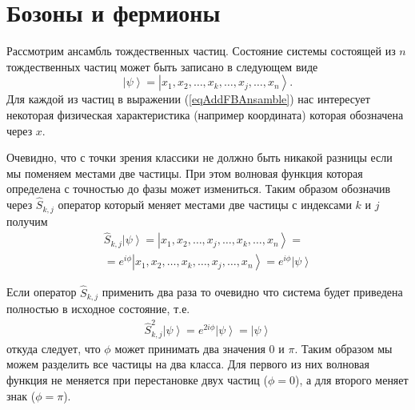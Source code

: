 \section{Бозоны и фермионы}
\label{AddFermionBoson}

Рассмотрим ансамбль тождественных частиц. Состояние системы состоящей
из $n$ тождественных частиц может быть записано в следующем виде
\begin{equation}
  \left|\psi\right> = \left|x_1, x_2, \dots, x_k, \dots, x_j, \dots,
  x_n\right>.
  \label{eqAddFBAnsamble}
\end{equation}
Для каждой из частиц в выражении (\ref{eqAddFBAnsamble}) нас
интересует некоторая физическая характеристика (например координата)
которая обозначена через $x$.

Очевидно, что с точки зрения
классики не должно быть никакой разницы если мы поменяем местами две
частицы. При этом волновая функция которая определена с точностью до
фазы может измениться. Таким образом обозначив через
$\hat{S}_{k,j}$ оператор который меняет местами две частицы с
индексами $k$ и $j$ получим 
\begin{eqnarray}
  \hat{S}_{k, j} \left|\psi\right> = \left|x_1, x_2, \dots, x_j,
  \dots, x_k, \dots,  x_n\right> =
  \nonumber \\
  = e^{i \phi} \left|x_1, x_2, \dots, x_k, \dots, x_j, \dots,
  x_n\right> = e^{i \phi} \left|\psi\right>
  \nonumber
\end{eqnarray}

Если оператор $\hat{S}_{k,j}$ применить два раза то очевидно что
система будет приведена полностью в исходное состояние, т.е.
\begin{eqnarray}
  \hat{S}_{k, j}^2 \left|\psi\right> =
  e^{2 i \phi} \left|\psi\right> = \left|\psi\right>
  \nonumber
\end{eqnarray}
откуда следует, что $\phi$ может принимать два значения $0$ и $\pi$.
Таким образом мы можем разделить все частицы на два класса. Для
первого из них волновая функция не меняется при перестановке двух
частиц ($\phi = 0$), а для второго меняет знак ($\phi = \pi$).

